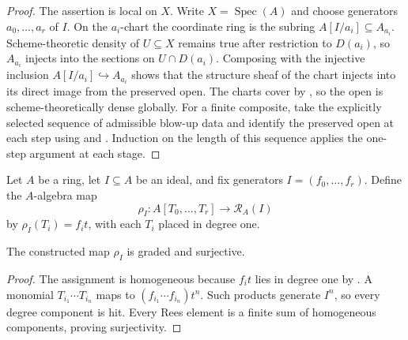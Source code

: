 \begin{proof}
  The assertion is local on $X$.  Write $X=\operatorname{Spec}(A)$ and choose
  generators $a_0,\ldots,a_r$ of $I$.  On the $a_i$-chart the coordinate ring
  is the subring $A[I/a_i]\subseteq A_{a_i}$.  Scheme-theoretic density of
  $U\subseteq X$ remains true after restriction to $D(a_i)$, so
  $A_{a_i}$ injects into the sections on $U\cap D(a_i)$.  Composing with the
  injective inclusion $A[I/a_i]\hookrightarrow A_{a_i}$ shows that the
  structure sheaf of the chart injects into its direct image from the
  preserved open.  The
  charts cover by , so the open is
  scheme-theoretically dense globally.  For a finite composite, take the
  explicitly selected sequence of admissible blow-up data and identify the
  preserved open at each step using
   and
  .  Induction on the length of this
  sequence applies the one-step argument at each stage.
\end{proof}

\begin{definition}
  \label{def:nagata-rees-polynomial-map}

  Let $A$ be a ring, let $I\subseteq A$ be an ideal, and fix generators
  $I=(f_0,\ldots,f_r)$.  Define the $A$-algebra map
  \[
    \rho_I\colon A[T_0,\ldots,T_r]\longrightarrow\mathcal R_A(I)
  \]
  by $\rho_I(T_i)=f_it$, with each $T_i$ placed in degree one.
\end{definition}

\begin{lemma}
  \label{lemma:nagata-rees-polynomial-surjection}

  The constructed map $\rho_I$ is graded and surjective.
\end{lemma}

\begin{proof}
  The assignment is homogeneous because $f_it$ lies in degree one by
  .  A monomial
  $T_{i_1}\cdots T_{i_n}$ maps to
  $(f_{i_1}\cdots f_{i_n})t^n$.  Such products generate $I^n$, so every
  degree component is hit.  Every Rees element is a finite sum of homogeneous
  components, proving surjectivity.
\end{proof}

